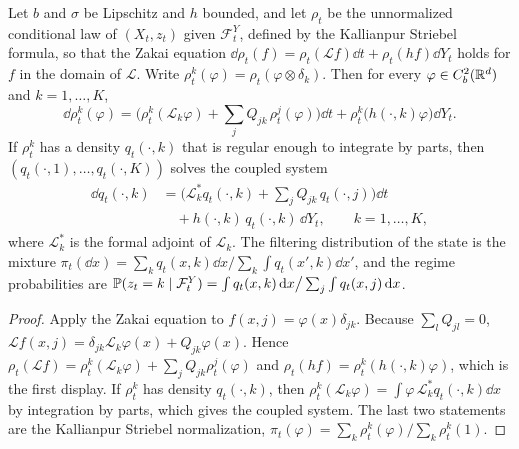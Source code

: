 \begin{proposition}
\label{prop:msw_zakai}
Let $b$ and $\sigma$ be Lipschitz and $h$ bounded, and let $\rho_t$ be the unnormalized conditional law of $(X_t,z_t)$ given $\mathcal{F}^Y_t$, defined by the Kallianpur Striebel formula, so that the Zakai equation $\dd\rho_t(f) = \rho_t(\mathcal{L}f)\dd t+\rho_t(hf)\dd Y_t$ holds for $f$ in the domain of $\mathcal{L}$. Write $\rho^k_t(\varphi) = \rho_t(\varphi\otimes\delta_k)$. Then for every $\varphi\in C^2_b(\mathbb{R}^d)$ and $k = 1,\dots,K$,
\[
\dd\rho^k_t(\varphi) = \Big(\rho^k_t(\mathcal{L}_k\varphi)+\sum_jQ_{jk}\,\rho^j_t(\varphi)\Big)\dd t+\rho^k_t\big(h(\cdot,k)\varphi\big)\dd Y_t.
\]
If $\rho^k_t$ has a density $q_t(\cdot,k)$ that is regular enough to integrate by parts, then $(q_t(\cdot,1),\dots,q_t(\cdot,K))$ solves the coupled system
\[
\begin{aligned}\dd q_t(\cdot,k) &= \Big(\mathcal{L}_k^*q_t(\cdot,k)+\sum_{j}Q_{jk}\,q_t(\cdot,j)\Big)\dd t\\ &\quad+h(\cdot,k)\,q_t(\cdot,k)\,\dd Y_t,\qquad k = 1,\dots,K,\end{aligned}
\]
where $\mathcal{L}_k^*$ is the formal adjoint of $\mathcal{L}_k$. The filtering distribution of the state is the mixture $\pi_t(\dd x) = \sum_kq_t(x,k)\dd x\big/\sum_k\int q_t(x',k)\dd x'$, and the regime probabilities are $\mathbb{P}(z_t = k\mid\mathcal{F}^Y_t) = \int q_t(x,k)\,\mathrm{d} x\big/\sum_j\int q_t(x,j)\,\mathrm{d} x$.
\end{proposition}

\begin{proof}
Apply the Zakai equation to $f(x,j) = \varphi(x)\delta_{jk}$. Because $\sum_lQ_{jl} = 0$, $\mathcal{L}f(x,j) = \delta_{jk}\mathcal{L}_k\varphi(x)+Q_{jk}\varphi(x)$. Hence $\rho_t(\mathcal{L}f) = \rho^k_t(\mathcal{L}_k\varphi)+\sum_jQ_{jk}\rho^j_t(\varphi)$ and $\rho_t(hf) = \rho^k_t(h(\cdot,k)\varphi)$, which is the first display. If $\rho^k_t$ has density $q_t(\cdot,k)$, then $\rho^k_t(\mathcal{L}_k\varphi) = \int\varphi\,\mathcal{L}_k^*q_t(\cdot,k)\dd x$ by integration by parts, which gives the coupled system. The last two statements are the Kallianpur Striebel normalization, $\pi_t(\varphi) = \sum_k\rho^k_t(\varphi)/\sum_k\rho^k_t(1)$.
\end{proof}

